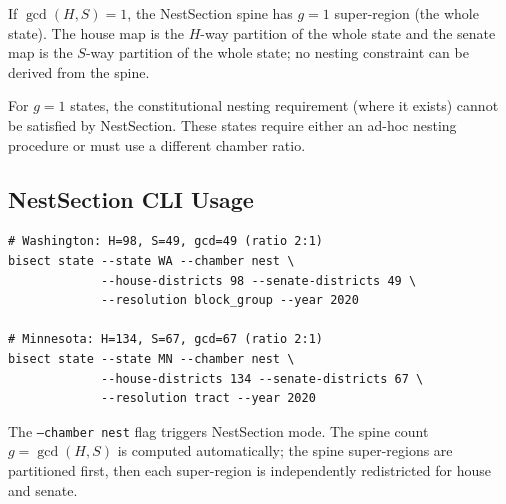 \begin{proposition}[Spine triviality when $g=1$]
  If $\gcd(H, S) = 1$, the NestSection spine has $g = 1$ super-region
  (the whole state). The house map is the $H$-way partition of the whole state
  and the senate map is the $S$-way partition of the whole state; no nesting
  constraint can be derived from the spine.
\end{proposition}

For $g = 1$ states, the constitutional nesting requirement (where it exists)
cannot be satisfied by NestSection. These states require either an ad-hoc
nesting procedure or must use a different chamber ratio.

\subsection{NestSection CLI Usage}
\label{sec:nestsection:cli}

\begin{verbatim}
# Washington: H=98, S=49, gcd=49 (ratio 2:1)
bisect state --state WA --chamber nest \
             --house-districts 98 --senate-districts 49 \
             --resolution block_group --year 2020

# Minnesota: H=134, S=67, gcd=67 (ratio 2:1)
bisect state --state MN --chamber nest \
             --house-districts 134 --senate-districts 67 \
             --resolution tract --year 2020
\end{verbatim}

The \texttt{--chamber nest} flag triggers NestSection mode. The spine count
$g = \gcd(H, S)$ is computed automatically; the spine super-regions are
partitioned first, then each super-region is independently redistricted for
house and senate.
